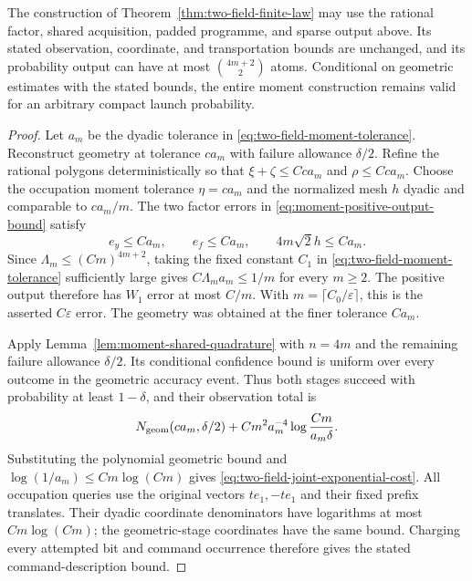 \begin{proposition}
\label{prop:moment-complete-budget}
The construction of Theorem~\ref{thm:two-field-finite-law} may use
the rational factor, shared acquisition, padded programme, and
sparse output above.  Its stated observation, coordinate, and
transportation bounds are unchanged, and its probability output
can have at most $\binom{4m+2}{2}$ atoms.
Conditional on geometric estimates with the stated bounds, the
entire moment construction remains valid for an arbitrary compact
launch probability.
\end{proposition}
\begin{proof}
Let $a_m$ be the dyadic tolerance in
\eqref{eq:two-field-moment-tolerance}.  Reconstruct geometry at
tolerance $c a_m$ with failure allowance $\delta/2$.  Refine the
rational polygons deterministically so that $\xi+\zeta\le Cc a_m$
and $\rho\le Cc a_m$.  Choose the occupation moment tolerance
$\eta=c a_m$ and the normalized mesh $h$ dyadic and comparable
to $c a_m/m$.  The two factor errors in
\eqref{eq:moment-positive-output-bound} satisfy
\[
 e_y\le C a_m,\qquad e_f\le C a_m,
          \qquad 4m\sqrt2h\le C a_m.
\]
Since $\Lambda_m\le(Cm)^{4m+2}$, taking the fixed constant $C_1$
in \eqref{eq:two-field-moment-tolerance} sufficiently large gives
$C\Lambda_m a_m\le1/m$ for every $m\ge2$.  The positive output
therefore has $W_1$ error at most $C/m$.  With
$m=\lceil C_0/\varepsilon\rceil$, this is the asserted
$C\varepsilon$ error.  The geometry was obtained at the finer
tolerance $Ca_m$.

Apply Lemma~\ref{lem:moment-shared-quadrature} with $n=4m$ and
the remaining failure allowance $\delta/2$.  Its conditional
confidence bound is uniform over every outcome in the geometric
accuracy event.  Thus both stages succeed with probability at
least $1-\delta$, and their observation total is
\[
 N_{\rm geom}(c a_m,\delta/2)
          +Cm^2a_m^{-4}\log\frac{Cm}{a_m\delta}.
\]
Substituting the polynomial geometric bound and
$\log(1/a_m)\le C m\log(Cm)$ gives
\eqref{eq:two-field-joint-exponential-cost}.  All occupation
queries use the original vectors $te_1,-te_1$ and their fixed
prefix translates.  Their dyadic coordinate denominators have
logarithms at most $C m\log(Cm)$; the geometric-stage coordinates
have the same bound.  Charging every attempted bit and command
occurrence therefore gives the stated command-description bound.


\end{proof}

